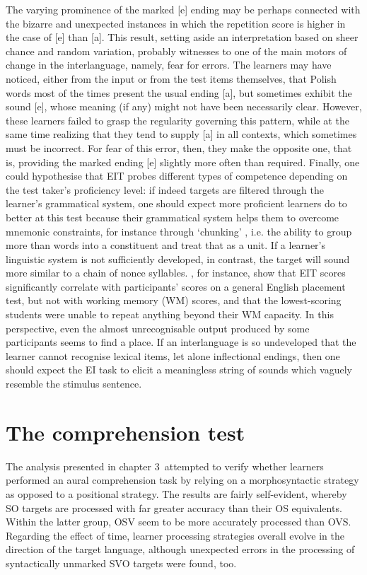 The varying prominence of the marked [e] ending may be perhaps connected with the bizarre and unexpected instances in which the repetition score is higher in the case of [e] than [a]. This result, setting aside an interpretation based on sheer chance and random variation, probably witnesses to one of the main motors of change in the interlanguage, namely, fear for errors. The learners may have noticed, either from the input or from the test items themselves, that Polish words most of the times present the usual ending [a], but sometimes exhibit the sound [e], whose meaning (if any) might not have been necessarily clear. However, these learners failed to grasp the regularity governing this pattern, while at the same time realizing that they tend to supply [a] in all contexts, which sometimes must be incorrect. For fear of this error, then, they make the opposite one, that is, providing the marked ending [e] slightly more often than required. Finally, one could hypothesise that EIT probes different types of competence depending on the test taker's proficiency level: if indeed targets are filtered through the learner's grammatical system, one should expect more proficient learners do to better at this test because their grammatical system helps them to overcome mnemonic constraints, for instance through ‘chunking’ \citep{Miller1956}, i.e. the ability to group more than words into a constituent and treat that as a unit. If a learner's linguistic system is not sufficiently developed, in contrast, the target will sound more similar to a chain of nonce syllables. \citet{OkuraLonsdale2012}, for instance, show that EIT scores significantly correlate with participants' scores on a general English placement test, but not with working memory (WM) scores, and that the lowest-scoring students were unable to repeat anything beyond their WM capacity. In this perspective, even the almost unrecognisable output produced by some participants seems to find a place. If an interlanguage is so undeveloped that the learner cannot recognise lexical items, let alone inflectional endings, then one should expect the EI task to elicit a meaningless string of sounds which vaguely resemble the stimulus sentence. 

\section{The comprehension test}\label{sec:08:3}

The analysis presented in chapter 3~attempted to verify whether learners performed an aural comprehension task by relying on a morphosyntactic strategy as opposed to a positional strategy. The results are fairly self-evident, whereby SO targets are processed with far greater accuracy than their OS equivalents. Within the latter group, OSV seem to be more accurately processed than OVS. Regarding the effect of time, learner processing strategies overall evolve in the direction of the target language, although unexpected errors in the processing of syntactically unmarked SVO targets were found, too.

